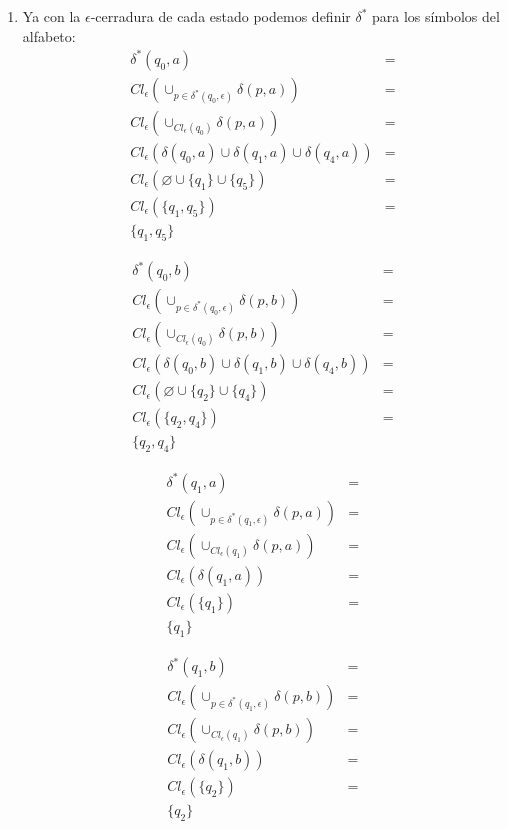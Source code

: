 \documentclass{article}
\begin{document}
\begin{enumerate}
{\begin{enumerate}
{				}
				
				\item{
					Ya con la $\epsilon$-cerradura de cada estado podemos definir $\delta^{*}$ para los símbolos del alfabeto:\\
					
					\begin{align*}
						\delta^{*} (q_{0},a)&=\\
						Cl_{\epsilon} (\cup_{p \in \delta^{*} (q_{0}, \epsilon)}	\delta (p,a)) &=\\
						Cl_{\epsilon} (\cup_{Cl_{\epsilon} (q_{0})}	\delta (p,a)) &=\\
						Cl_{\epsilon} ( \delta(q_{0},a) \cup \delta(q_{1},a) \cup \delta(q_{4},a)) &=\\
						Cl_{\epsilon} ( \varnothing \cup \{q_{1}\} \cup \{q_{5}\}) &=\\
						Cl_{\epsilon} (\{q_{1}, q_{5}\}) &=\\
						\{q_{1}, q_{5}\}
					\end{align*}
					
					\begin{align*}
					\delta^{*} (q_{0},b)&=\\
					Cl_{\epsilon} (\cup_{p \in \delta^{*} (q_{0}, \epsilon)}	\delta (p,b)) &=\\
					Cl_{\epsilon} (\cup_{Cl_{\epsilon} (q_{0})}	\delta (p,b)) &=\\
					Cl_{\epsilon} ( \delta(q_{0},b) \cup \delta(q_{1},b) \cup \delta(q_{4},b)) &=\\
					Cl_{\epsilon} ( \varnothing \cup \{q_{2}\} \cup \{q_{4}\}) &=\\
					Cl_{\epsilon} (\{q_{2}, q_{4}\}) &=\\
					\{q_{2}, q_{4}\}
					\end{align*}
				
					\begin{align*}
					\delta^{*} (q_{1},a)&=\\
					Cl_{\epsilon} (\cup_{p \in \delta^{*} (q_{1}, \epsilon)}	\delta (p,a)) &=\\
					Cl_{\epsilon} (\cup_{Cl_{\epsilon} (q_{1})}	\delta (p,a)) &=\\
					Cl_{\epsilon} ( \delta(q_{1},a)) &=\\
					Cl_{\epsilon} (\{q_{1}\}) &=\\
					\{q_{1}\}
					\end{align*}
					
					\begin{align*}
					\delta^{*} (q_{1},b)&=\\
					Cl_{\epsilon} (\cup_{p \in \delta^{*} (q_{1}, \epsilon)}	\delta (p,b)) &=\\
					Cl_{\epsilon} (\cup_{Cl_{\epsilon} (q_{1})}	\delta (p,b)) &=\\
					Cl_{\epsilon} ( \delta(q_{1},b)) &=\\
					Cl_{\epsilon} (\{q_{2}\}) &=\\
					\{q_{2}\}
					\end{align*}
					
}
\end{enumerate}}
\end{enumerate}
\end{document}
